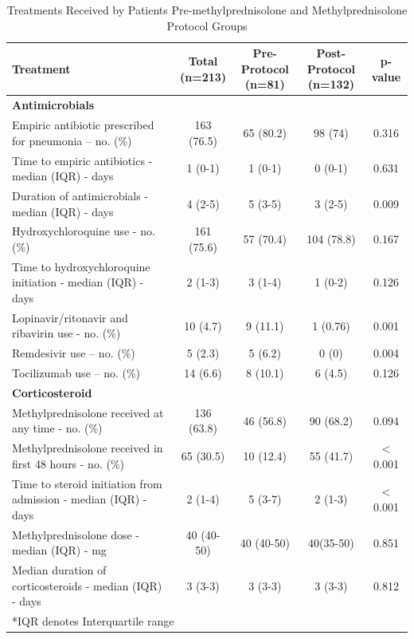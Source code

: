 \begin{table}
\footnotesize
\caption{Treatments Received by Patients Pre-methylprednisolone and Methylprednisolone Protocol Groups}
\begin{center}
\begin{tabular}{p{7.5cm} cccc}
\hline
\textbf{Treatment} & 	\makecell{\textbf{Total} \\ \textbf{(n=213)}} &	\makecell{\textbf{Pre-Protocol} \\ \textbf{(n=81)}}	&\makecell{\textbf{Post-Protocol} \\ \textbf{(n=132)}}	& \textbf{p-value}\\
\hline
\multicolumn{5}{l}{\textbf{Antimicrobials}}\\
\hline
Empiric antibiotic prescribed for pneumonia -- no. (\%)	&163 (76.5)&	65 (80.2)	&98 (74)	&0.316\\
Time to empiric antibiotics - median (IQR) - days	&1 (0-1)&	1 (0-1)	&0 (0-1)	&0.631\\
Duration of antimicrobials - median (IQR) - days	&4 (2-5)	&5 (3-5)	&3 (2-5)	&0.009\\
Hydroxychloroquine use - no. (\%)	&161 (75.6)	&57 (70.4)&	104 (78.8)&	0.167\\
Time to hydroxychloroquine initiation - median (IQR) - days&	2 (1-3)	&3 (1-4)&	1 (0-2)&	0.126\\

Lopinavir/ritonavir and ribavirin use - no. (\%)&	10 (4.7)	&9 (11.1)	&1 (0.76)	&0.001\\
Remdesivir use -- no. (\%)	&5 (2.3)&	5 (6.2)	&0 (0)&	0.004\\
Tocilizumab use -- no. (\%)	&14 (6.6)&	8 (10.1)	&6 (4.5)	&0.126\\

\hline
\multicolumn{5}{l}{\textbf{Corticosteroid }}\\
\hline

Methylprednisolone received at any time - no. (\%)	&136 (63.8)&	46 (56.8)	&90 (68.2)	&0.094\\
Methylprednisolone received in first 48 hours - no. (\%)&	65 (30.5)	&10 (12.4)&	55 (41.7)	&$<$0.001\\
Time to steroid initiation from admission - median (IQR) - days &	2 (1-4)&	5 (3-7)	&2 (1-3)&	$<$0.001\\
Methylprednisolone dose - median (IQR) - mg	&40 (40-50)	&40 (40-50)&	40(35-50)	&0.851\\
Median duration of corticosteroids - median (IQR) - days&	3 (3-3)&	3 (3-3)&	3 (3-3)	&0.812\\


\hline

\multicolumn{5}{l}{*IQR denotes Interquartile range} \\
\end{tabular}

\end{center}
\label{additionaltreatment}
\end{table}%


